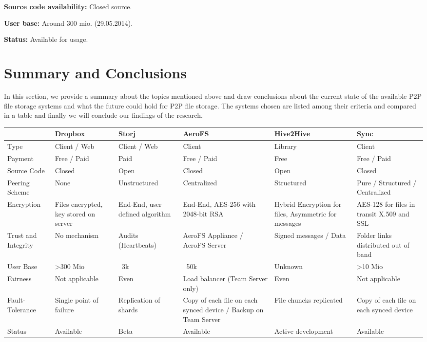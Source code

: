 \textbf{Source code availability:} Closed source.

\textbf{User base:} Around 300 mio. (29.05.2014)\cite{dropbox:userbase}.

\textbf{Status:} Available for usage.

\section{Summary and Conclusions}
In this section, we provide a summary about the topics mentioned above and draw conclusions about the current state of the available P2P file storage systems and what the future could hold for P2P file storage. The systems chosen are listed among their criteria and compared in a table and finally we will conclude our findings of the research.

\begin{table}
	\centering
		\begin{tabular}{ | *{6}{ p{2.5cm} |} }
			\hline
			& Dropbox & Storj & AeroFS & Hive2Hive & Sync \\ \hline
			Type & Client / Web & Client / Web & Client & Library & Client \\ \hline
			Payment & Free / Paid & Paid & Free / Paid & Free & Free / Paid \\ \hline
			Source Code & Closed & Open & Closed & Open & Closed \\ \hline
			Peering Scheme & None & Unstructured & Centralized & Structured & Pure / Structured / Centralized \\ \hline
			Encryption & Files encrypted, key stored on server & End-End, user defined algorithm & End-End, AES-256 with 2048-bit RSA & Hybrid Encryption for files, Asymmetric for messages & AES-128 for files in transit X.509 and SSL \\ \hline
			Trust and Integrity & No mechanism & Audits (Heartbeats) & AeroFS Appliance / AeroFS Server & Signed messages / Data & Folder links distributed out of band \\ \hline
			User Base & >300 Mio & ~3k & ~50k & Unknown & >10 Mio \\ \hline
			Fairness & Not applicable & Even & Load balancer (Team Server only) & Even & Not applicable \\ \hline
			Fault-Tolerance & Single point of failure & Replication of shards & Copy of each file on each synced device / Backup on Team Server & File chuncks replicated & Copy of each file on each synced device \\ \hline
			Status & Available & Beta & Available & Active development & Available \\ \hline
		\end{tabular}
\end{table}

